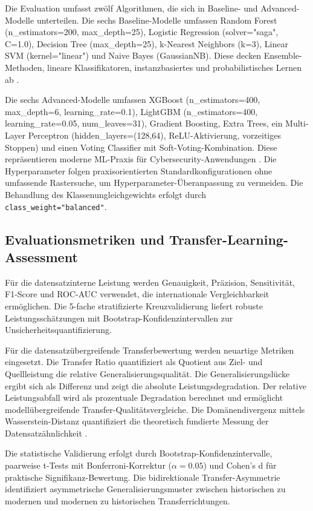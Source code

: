 \documentclass[11pt,a4paper]{article}
\begin{document}
    Die Evaluation umfasst zwölf Algorithmen, die sich in Baseline- und Advanced-Modelle unterteilen. Die sechs Baseline-Modelle umfassen Random Forest (n\_estimators=200, max\_depth=25), Logistic Regression (solver="saga", C=1.0), Decision Tree (max\_depth=25), k-Nearest Neighbors (k=3), Linear SVM (kernel="linear") und Naive Bayes (GaussianNB). Diese decken Ensemble-Methoden, lineare Klassifikatoren, instanzbasiertes und probabilistisches Lernen ab \parencite{Hastie2009}.

    Die sechs Advanced-Modelle umfassen XGBoost (n\_estimators=400, max\_depth=6, learning\_rate=0.1), LightGBM (n\_estimators=400, learning\_rate=0.05, num\_leaves=31), Gradient Boosting, Extra Trees, ein Multi-Layer Perceptron (hidden\_layers=(128,64), ReLU-Aktivierung, vorzeitiges Stoppen) und einen Voting Classifier mit Soft-Voting-Kombination. Diese repräsentieren moderne ML-Praxis für Cybersecurity-Anwendungen \parencite{Vinayakumar2019}. Die Hyperparameter folgen praxisorientierten Standardkonfigurationen ohne umfassende Rastersuche, um Hyperparameter-Überanpassung zu vermeiden. Die Behandlung des Klassenungleichgewichts erfolgt durch \texttt{class\_weight="balanced"}.

    \subsection{Evaluationsmetriken und Transfer-Learning-Assessment}

    Für die datensatzinterne Leistung werden Genauigkeit, Präzision, Sensitivität, F1-Score und ROC-AUC verwendet, die internationale Vergleichbarkeit ermöglichen. Die 5-fache stratifizierte Kreuzvalidierung liefert robuste Leistungsschätzungen mit Bootstrap-Konfidenzintervallen zur Unsicherheitsquantifizierung.

    Für die datensatzübergreifende Transferbewertung werden neuartige Metriken eingesetzt. Die Transfer Ratio quantifiziert als Quotient aus Ziel- und Quellleistung die relative Generalisierungsqualität. Die Generalisierungslücke ergibt sich als Differenz und zeigt die absolute Leistungsdegradation. Der relative Leistungsabfall wird als prozentuale Degradation berechnet und ermöglicht modellübergreifende Transfer-Qualitätsvergleiche. Die Domänendivergenz mittels Wasserstein-Distanz quantifiziert die theoretisch fundierte Messung der Datensatzähnlichkeit \parencite{Mourouzis2021}.

    Die statistische Validierung erfolgt durch Bootstrap-Konfidenzintervalle, paarweise t-Tests mit Bonferroni-Korrektur ($\alpha=0.05$) und Cohen's d für praktische Signifikanz-Bewertung. Die bidirektionale Transfer-Asymmetrie identifiziert asymmetrische Generalisierungsmuster zwischen historischen zu modernen und modernen zu historischen Transferrichtungen.
\end{document}

